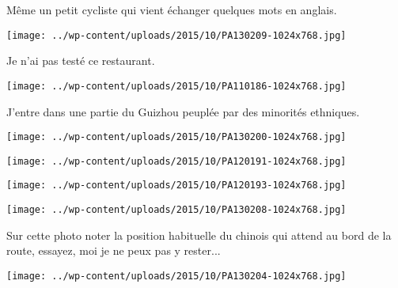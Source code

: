  Même un petit cycliste qui vient échanger quelques mots en anglais. 
\begin{center} \texttt{[image: ../wp-content/uploads/2015/10/PA130209-1024x768.jpg]} \end{center}

\pagebreak
 Je n'ai pas testé ce restaurant. 
\begin{center} \texttt{[image: ../wp-content/uploads/2015/10/PA110186-1024x768.jpg]} \end{center}

 J'entre dans une partie du Guizhou peuplée par des minorités ethniques. 
\begin{center} \texttt{[image: ../wp-content/uploads/2015/10/PA130200-1024x768.jpg]} \end{center}
\begin{center} \texttt{[image: ../wp-content/uploads/2015/10/PA120191-1024x768.jpg]} \end{center}
\begin{center} \texttt{[image: ../wp-content/uploads/2015/10/PA120193-1024x768.jpg]} \end{center}
\begin{center} \texttt{[image: ../wp-content/uploads/2015/10/PA130208-1024x768.jpg]} \end{center}

 Sur cette photo noter la position habituelle du chinois qui attend au bord de la route, essayez, moi je ne peux pas y rester...
\begin{center} \texttt{[image: ../wp-content/uploads/2015/10/PA130204-1024x768.jpg]} \end{center}
